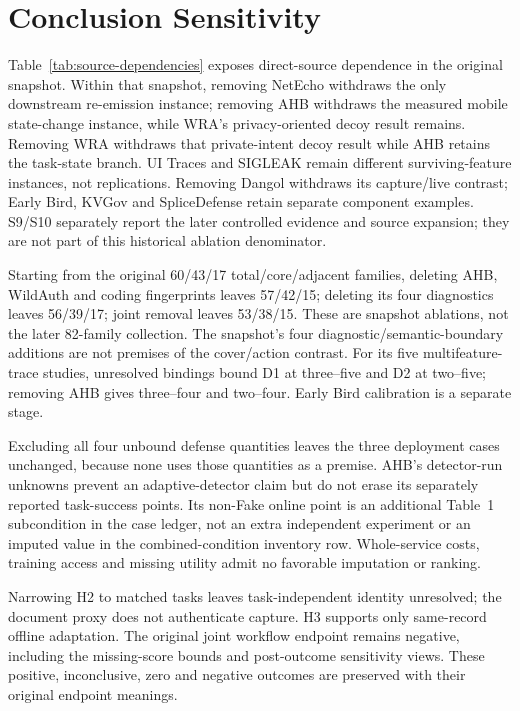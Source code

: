 \section{Conclusion Sensitivity}\label{app:claim-sensitivity}\label{sec:claim-sensitivity}
Table~\ref{tab:source-dependencies} exposes direct-source dependence in the original snapshot. Within that snapshot, removing NetEcho withdraws the only downstream re-emission instance; removing AHB withdraws the measured mobile state-change instance, while WRA's privacy-oriented decoy result remains. Removing WRA withdraws that private-intent decoy result while AHB retains the task-state branch. UI Traces and SIGLEAK remain different surviving-feature instances, not replications. Removing Dangol withdraws its capture/live contrast; Early Bird, KVGov and SpliceDefense retain separate component examples. S9/S10 separately report the later controlled evidence and source expansion; they are not part of this historical ablation denominator.

Starting from the original 60/43/17 total/core/adjacent families, deleting AHB, WildAuth and coding fingerprints leaves 57/42/15; deleting its four diagnostics leaves 56/39/17; joint removal leaves 53/38/15. These are snapshot ablations, not the later 82-family collection. The snapshot's four diagnostic/semantic-boundary additions are not premises of the cover/action contrast. For its five multifeature-trace studies, unresolved bindings bound D1 at three--five and D2 at two--five; removing AHB gives three--four and two--four. Early Bird calibration is a separate stage.

Excluding all four unbound defense quantities leaves the three deployment cases unchanged, because none uses those quantities as a premise. AHB's detector-run unknowns prevent an adaptive-detector claim but do not erase its separately reported task-success points. Its non-Fake online point is an additional Table~1 subcondition in the case ledger, not an extra independent experiment or an imputed value in the combined-condition inventory row. Whole-service costs, training access and missing utility admit no favorable imputation or ranking.

Narrowing H2 to matched tasks leaves task-independent identity unresolved; the document proxy does not authenticate capture. H3 supports only same-record offline adaptation. The original joint workflow endpoint remains negative, including the missing-score bounds and post-outcome sensitivity views. These positive, inconclusive, zero and negative outcomes are preserved with their original endpoint meanings.
